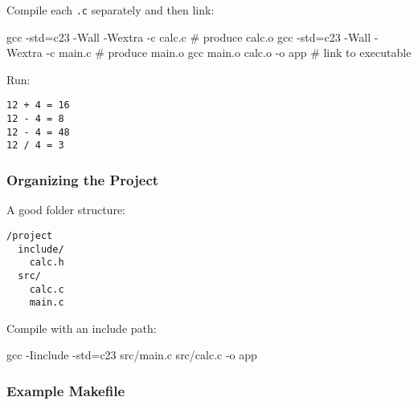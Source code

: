 \documentclass[
  letterpaper,
  DIV=11,
  numbers=noendperiod]{scrreprt}
\newenvironment{Shaded}{\begin{snugshade}}{\end{snugshade}}
\newcommand{\AttributeTok}[1]{\textcolor[rgb]{0.40,0.45,0.13}{#1}}
\newcommand{\CommentTok}[1]{\textcolor[rgb]{0.37,0.37,0.37}{#1}}
\newcommand{\FunctionTok}[1]{\textcolor[rgb]{0.28,0.35,0.67}{#1}}
\newcommand{\NormalTok}[1]{\textcolor[rgb]{0.00,0.23,0.31}{#1}}
\newcommand{\OperatorTok}[1]{\textcolor[rgb]{0.37,0.37,0.37}{#1}}
\begin{document}
Compile each \texttt{.c} separately and then link:

\begin{Shaded}
\begin{Highlighting}[]
\FunctionTok{gcc} \AttributeTok{{-}std}\OperatorTok{=}\NormalTok{c23 }\AttributeTok{{-}Wall} \AttributeTok{{-}Wextra} \AttributeTok{{-}c}\NormalTok{ calc.c   }\CommentTok{\# produce calc.o}
\FunctionTok{gcc} \AttributeTok{{-}std}\OperatorTok{=}\NormalTok{c23 }\AttributeTok{{-}Wall} \AttributeTok{{-}Wextra} \AttributeTok{{-}c}\NormalTok{ main.c   }\CommentTok{\# produce main.o}
\FunctionTok{gcc}\NormalTok{ main.o calc.o }\AttributeTok{{-}o}\NormalTok{ app               }\CommentTok{\# link to executable}
\end{Highlighting}
\end{Shaded}

Run:

\begin{verbatim}
12 + 4 = 16
12 - 4 = 8
12 - 4 = 48
12 / 4 = 3
\end{verbatim}

\subsubsection{Organizing the Project}\label{organizing-the-project}

A good folder structure:

\begin{verbatim}
/project
  include/
    calc.h
  src/
    calc.c
    main.c
\end{verbatim}

Compile with an include path:

\begin{Shaded}
\begin{Highlighting}[]
\FunctionTok{gcc} \AttributeTok{{-}Iinclude} \AttributeTok{{-}std}\OperatorTok{=}\NormalTok{c23 src/main.c src/calc.c }\AttributeTok{{-}o}\NormalTok{ app}
\end{Highlighting}
\end{Shaded}

\subsubsection{Example Makefile}\label{example-makefile}

\begin{Shaded}
\end{Shaded}
\end{document}
